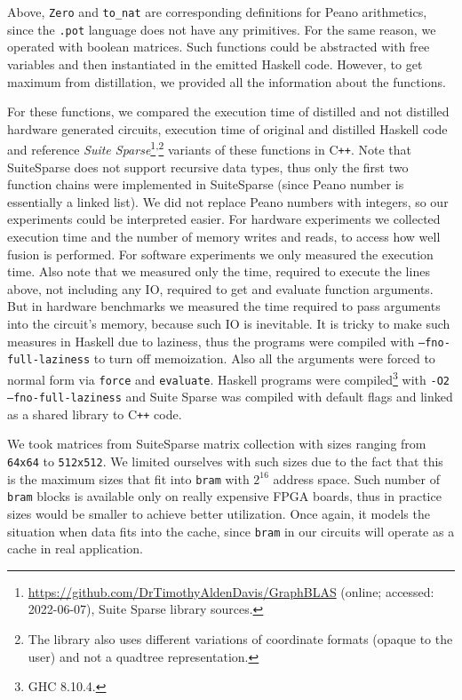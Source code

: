 Above, \texttt{Zero} and \texttt{to\_nat} are corresponding definitions for Peano arithmetics, since the \texttt{.pot} language does not have any primitives. For the same reason, we operated with boolean matrices. Such functions could be abstracted with free variables and then instantiated in the emitted Haskell code. However, to get maximum from distillation, we provided all the information about the functions. 

For these functions, we compared the execution time of distilled and not distilled hardware generated circuits, execution time of original and distilled Haskell code and reference \textit{Suite Sparse}\footnote{\url{https://github.com/DrTimothyAldenDavis/GraphBLAS} (online; accessed:
2022-06-07), Suite Sparse library sources.}\textsuperscript{,}\footnote{The library also uses different variations of coordinate formats (opaque to the user) and not a quadtree representation.} variants of these functions in C\texttt{++}. Note that SuiteSparse does not support recursive data types, thus only the first two function chains were implemented in SuiteSparse (since Peano number is essentially a linked list). We did not replace Peano numbers with integers, so our experiments could be interpreted easier. For hardware experiments we collected execution time and the number of memory writes and reads, to access how well fusion is performed. For software experiments we only measured the execution time. Also note that we measured only the time, required to execute the lines above, not including any IO, required to get and evaluate function arguments. But in hardware benchmarks we measured the time required to pass arguments into the circuit's memory, because such IO is inevitable. It is tricky to make such measures in Haskell due to laziness, thus the programs were compiled with \texttt{--fno-full-laziness} to turn off memoization. Also all the arguments were forced to normal form via \texttt{force} and \texttt{evaluate}. Haskell programs were compiled\footnote{GHC 8.10.4.} with \texttt{-O2 --fno-full-laziness} and Suite Sparse was compiled with default flags and linked as a shared library to C\texttt{++} code.

We took matrices from SuiteSparse matrix collection with sizes ranging from \texttt{64x64} to \texttt{512x512}. We limited ourselves with such sizes due to the fact that this is the maximum sizes that fit into \texttt{bram} with $2^{16}$ address space. Such number of \texttt{bram} blocks is available only on really expensive FPGA boards, thus in practice sizes would be smaller to achieve better utilization. Once again, it models the situation when data fits into the cache, since \texttt{bram} in our circuits will operate as a cache in real application.

